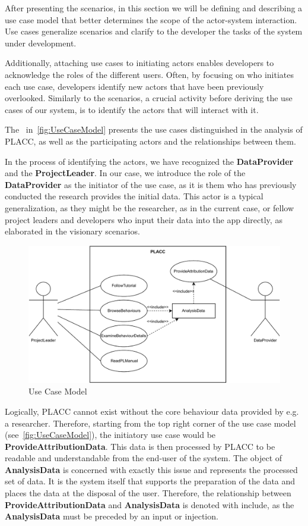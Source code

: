 After presenting the scenarios,  in this section we will be defining and describing a use case model that better determines the scope of the actor-system interaction.  Use cases generalize scenarios and clarify to the developer the tasks of the system under development.  

Additionally,  attaching use cases to initiating actors enables developers to acknowledge the roles of the different users. Often, by focusing on who initiates each use case, developers identify new actors that have been previously overlooked.  Similarly to the scenarios, a crucial activity before deriving the use cases of our system, is to identify the actors that will interact with it.  

The~ in~\autoref{fig:UseCaseModel} presents the use cases distinguished in the analysis of PLACC, as well as the participating actors and the relationships between them.

In the process of identifying the actors,  we have recognized the \textbf{DataProvider} and the \textbf{ProjectLeader}. In our case, we introduce the role of the \textbf{DataProvider} as the initiator of the use case, as it is them who has previously conducted the research provides the initial data. This actor is a typical generalization, as they might be the researcher,  as in the current case, or fellow project leaders and developers who input their data into the app directly, as elaborated in the visionary scenarios. 

\begin{figure}
\includegraphics[width= \textwidth]{figures/UseCaseModel.pdf}
\caption{Use Case Model}
\label{fig:UseCaseModel}
\end{figure}

Logically,  PLACC cannot exist without the core behaviour data provided by e.g.  a researcher. Therefore,  starting from the top right corner of the use case model (see~\autoref{fig:UseCaseModel}), the initiatory use case would be \textbf{ProvideAttributionData}.  This data is then processed by PLACC to be readable and understandable from the end-user of the system.  The object of \textbf{AnalysisData} is concerned with exactly this issue and represents the processed set of data.  It is the system itself that supports the preparation of the data and places the data at the disposal of the user.  Therefore, the relationship between \textbf{ProvideAttributionData} and \textbf{AnalysisData} is denoted with include,  as the \textbf{AnalysisData} must be preceded by an input or injection.

